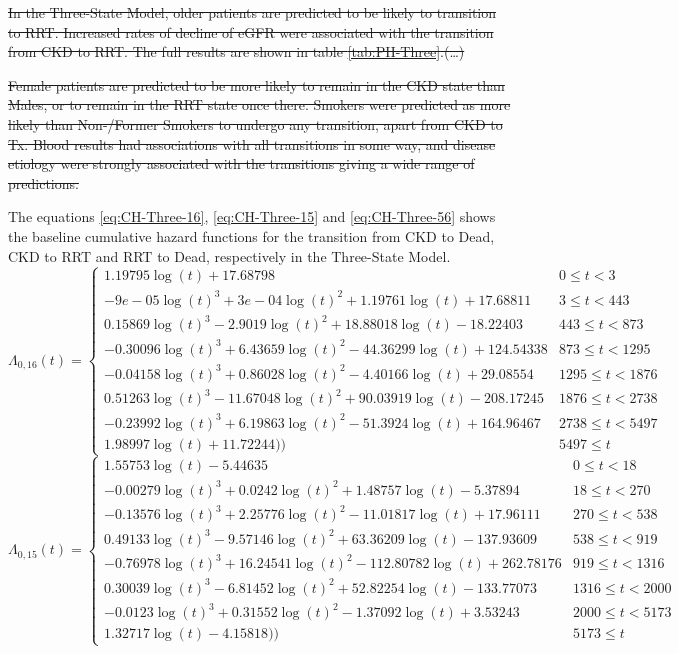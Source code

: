 \documentclass[
]{article}
\begin{document}
\sout{In the Three-State Model, older patients are predicted to be likely to transition to RRT. Increased rates of decline of eGFR were associated with the transition from CKD to RRT. The full results are shown in table \ref{tab:PH-Three}.(\ldots)}

\sout{Female patients are predicted to be more likely to remain in the CKD state than Males, or to remain in the RRT state once there. Smokers were predicted as more likely than Non-/Former Smokers to undergo any transition, apart from CKD to Tx. Blood results had associations with all transitions in some way, and disease etiology were strongly associated with the transitions giving a wide range of predictions.}

The equations \eqref{eq:CH-Three-16}, \eqref{eq:CH-Three-15} and \eqref{eq:CH-Three-56} shows the baseline cumulative hazard functions for the transition from CKD to Dead, CKD to RRT and RRT to Dead, respectively in the Three-State Model.
\begin{equation}
\Lambda_{0,16}(t)=\begin{cases} 1.19795\log(t)+17.68798 & 0 \le t < 3 \\ -9e-05\log(t)^3+3e-04\log(t)^2+1.19761\log(t)+17.68811 & 3 \le t < 443 \\ 0.15869\log(t)^3-2.9019\log(t)^2+18.88018\log(t)-18.22403 & 443 \le t < 873 \\ -0.30096\log(t)^3+6.43659\log(t)^2-44.36299\log(t)+124.54338 & 873 \le t < 1295 \\ -0.04158\log(t)^3+0.86028\log(t)^2-4.40166\log(t)+29.08554 & 1295 \le t < 1876 \\ 0.51263\log(t)^3-11.67048\log(t)^2+90.03919\log(t)-208.17245 & 1876 \le t < 2738 \\ -0.23992\log(t)^3+6.19863\log(t)^2-51.3924\log(t)+164.96467 & 2738 \le t < 5497 \\ 1.98997\log(t)+11.72244)) & 5497 \le t \label{eq:CH-Three-16}\end{cases}
\end{equation}
\begin{equation}
\Lambda_{0,15}(t)=\begin{cases} 1.55753\log(t)-5.44635 & 0 \le t < 18 \\ -0.00279\log(t)^3+0.0242\log(t)^2+1.48757\log(t)-5.37894 & 18 \le t < 270 \\ -0.13576\log(t)^3+2.25776\log(t)^2-11.01817\log(t)+17.96111 & 270 \le t < 538 \\ 0.49133\log(t)^3-9.57146\log(t)^2+63.36209\log(t)-137.93609 & 538 \le t < 919 \\ -0.76978\log(t)^3+16.24541\log(t)^2-112.80782\log(t)+262.78176 & 919 \le t < 1316 \\ 0.30039\log(t)^3-6.81452\log(t)^2+52.82254\log(t)-133.77073 & 1316 \le t < 2000 \\ -0.0123\log(t)^3+0.31552\log(t)^2-1.37092\log(t)+3.53243 & 2000 \le t < 5173 \\ 1.32717\log(t)-4.15818)) & 5173 \le t \label{eq:CH-Three-15}\end{cases}
\end{equation}
\end{document}
